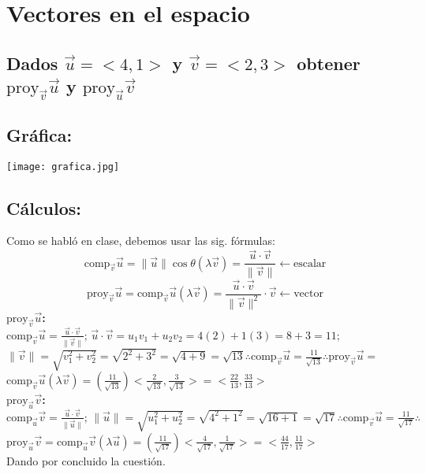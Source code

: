 \documentclass[letterpaper, 12pt]{article}
\begin{document}
\setcounter{page}{1}
\thispagestyle{fancy}
\section{Vectores en el espacio}
\subsection*{Dados \(\vec{u}=<\!4,1\!>\) y \(\vec{v}=<\!2,3\!>\) obtener \(\text{proy}_{\vec{v}}\vec{u}\) y \(\text{proy}_{\vec{u}}\vec{v}\) }
\subsection*{Gráfica:}
\centering
\texttt{[image: grafica.jpg]}
\justify
\subsection*{Cálculos:}
\justify
Como se habló en clase, debemos usar las sig. fórmulas:
\[\text{comp}_{\vec{v}}\vec{u}=\lVert\vec{u}\rVert\cos\theta\left(\lambda\vec{v}\right)=\frac{\vec{u}\cdot\vec{v}}{\lVert\vec{v}\rVert}\leftarrow\text{escalar}\]
\[\text{proy}_{\vec{v}}\vec{u}=\text{comp}_{\vec{v}}\vec{u}\left(\lambda\vec{v}\right)=\frac{\vec{u}\cdot\vec{v}}{\lVert\vec{v}\rVert^2}\cdot\vec{v}\leftarrow\text{vector}\]
\textbf{\(\text{proy}_{\vec{v}}\vec{u}\):}\\ \newline
\(\text{comp}_{\vec{v}}\vec{u}=\frac{\vec{u}\cdot\vec{v}}{\lVert\vec{v}\rVert};\,\vec{u}\cdot\vec{v}=u_1v_1+u_2v_2=4(2)+1(3)=8+3=11;\)\\
\(\lVert\vec{v}\rVert=\sqrt{v_1^2+v_2^2}=\sqrt{2^2+3^2}=\sqrt{4+9}=\sqrt{13}\therefore \text{comp}_{\vec{v}}\vec{u}=\frac{11}{\sqrt{13}}\therefore \text{proy}_{\vec{v}}\vec{u}=\)\\
\(\text{comp}_{\vec{v}}\vec{u}\left(\lambda \vec{v}\right)=\left(\frac{11}{\sqrt{13}}\right)\!<\!\frac{2}{\sqrt{13}},\frac{3}{\sqrt{13}}\!>=<\!\frac{22}{13},\frac{33}{13}\!>\)\\
\textbf{\(\text{proy}_{\vec{u}}\vec{v}\):}\\ \newline
\(\text{comp}_{\vec{u}}\vec{v}=\frac{\vec{u}\cdot\vec{v}}{\lVert\vec{u}\rVert};\,\lVert\vec{u}\rVert=\sqrt{u_1^2+u_2^2}=\sqrt{4^2+1^2}=\sqrt{16+1}=\sqrt{17}\therefore\text{comp}_{\vec{v}}\vec{u}=\frac{11}{\sqrt{17}}\therefore\)\\
\(\text{proy}_{\vec{u}}\vec{v}=\text{comp}_{\vec{u}}\vec{v}\left(\lambda \vec{u}\right)=\left(\frac{11}{\sqrt{17}}\right)\!<\!\frac{4}{\sqrt{17}},\frac{1}{\sqrt{17}}\!>=<\!\frac{44}{17},\frac{11}{17}\!>\)\\ \newline
Dando por concluido la cuestión.
\end{document}

